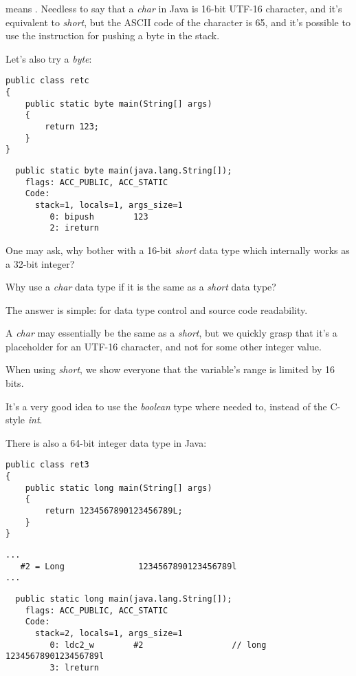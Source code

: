  means .
Needless to say that a \emph{char} in Java is 16-bit UTF-16 character,
and it's equivalent to \emph{short}, but the ASCII code of the  character is 65, and it's possible
to use the instruction for pushing a byte in the stack.

Let's also try a \emph{byte}:

\begin{lstlisting}[style=customjava]
public class retc
{
	public static byte main(String[] args)
	{
		return 123;
	}
}
\end{lstlisting}

\begin{lstlisting}
  public static byte main(java.lang.String[]);
    flags: ACC_PUBLIC, ACC_STATIC
    Code:
      stack=1, locals=1, args_size=1
         0: bipush        123
         2: ireturn
\end{lstlisting}

One may ask, why bother with a 16-bit \emph{short} data type which internally works
as a 32-bit integer?

Why use a \emph{char} data type if it is the same as a \emph{short} data type?

The answer is simple: for data type control and source code readability.

A \emph{char} may essentially be the same as a \emph{short}, but we quickly grasp that it's a placeholder for
an UTF-16 character, and not for some other integer value.

When using \emph{short}, we show everyone that the variable's range is limited by 16 bits.

It's a very good idea to use the \emph{boolean} type where needed to,
instead of the C-style \emph{int}.

There is also a 64-bit integer data type in Java:

\begin{lstlisting}[style=customjava]
public class ret3
{
	public static long main(String[] args)
	{
		return 1234567890123456789L;
	}
}
\end{lstlisting}

\begin{lstlisting}[caption=Constant pool]
...
   #2 = Long               1234567890123456789l
...
\end{lstlisting}

\begin{lstlisting}
  public static long main(java.lang.String[]);
    flags: ACC_PUBLIC, ACC_STATIC
    Code:
      stack=2, locals=1, args_size=1
         0: ldc2_w        #2                  // long 1234567890123456789l
         3: lreturn
\end{lstlisting}

